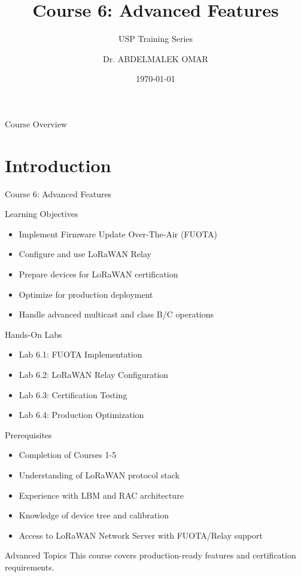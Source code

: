 \documentclass{beamer}
\title[USP Course 6: Advanced Features]{Course 6: Advanced Features}
\subtitle{USP Training Series}
\author{Dr. ABDELMALEK OMAR}
\institute{USP Zephyr Training Series\\Copyright \copyright{} 2025 Dr. ABDELMALEK OMAR}
\date{\today}
\begin{document}
\begin{frame}
\titlepage
\end{frame}

\begin{frame}{Course Overview}
\tableofcontents
\end{frame}

\section{Introduction}

\begin{frame}{Course 6: Advanced Features}
\begin{block}{Learning Objectives}
\begin{itemize}
    \item Implement Firmware Update Over-The-Air (FUOTA)
    \item Configure and use LoRaWAN Relay
    \item Prepare devices for LoRaWAN certification
    \item Optimize for production deployment
    \item Handle advanced multicast and class B/C operations
\end{itemize}
\end{block}

\vspace{0.5cm}

\begin{block}{Hands-On Labs}
\begin{itemize}
    \item Lab 6.1: FUOTA Implementation
    \item Lab 6.2: LoRaWAN Relay Configuration
    \item Lab 6.3: Certification Testing
    \item Lab 6.4: Production Optimization
\end{itemize}
\end{block}
\end{frame}

\begin{frame}{Prerequisites}
\begin{itemize}
    \item Completion of Courses 1-5
    \item Understanding of LoRaWAN protocol stack
    \item Experience with LBM and RAC architecture
    \item Knowledge of device tree and calibration
    \item Access to LoRaWAN Network Server with FUOTA/Relay support
\end{itemize}

\vspace{0.5cm}

\begin{alertblock}{Advanced Topics}
This course covers production-ready features and certification requirements.
\end{alertblock}
\end{frame}
\end{document}
